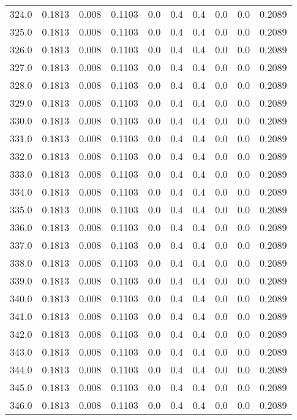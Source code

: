 \begin{longtable}{lrrrrrrrrr}
324.0 & 0.1813 & 0.008 & 0.1103 & 0.0 & 0.4 & 0.4 & 0.0 & 0.0 & 0.2089 \\
325.0 & 0.1813 & 0.008 & 0.1103 & 0.0 & 0.4 & 0.4 & 0.0 & 0.0 & 0.2089 \\
326.0 & 0.1813 & 0.008 & 0.1103 & 0.0 & 0.4 & 0.4 & 0.0 & 0.0 & 0.2089 \\
327.0 & 0.1813 & 0.008 & 0.1103 & 0.0 & 0.4 & 0.4 & 0.0 & 0.0 & 0.2089 \\
328.0 & 0.1813 & 0.008 & 0.1103 & 0.0 & 0.4 & 0.4 & 0.0 & 0.0 & 0.2089 \\
329.0 & 0.1813 & 0.008 & 0.1103 & 0.0 & 0.4 & 0.4 & 0.0 & 0.0 & 0.2089 \\
330.0 & 0.1813 & 0.008 & 0.1103 & 0.0 & 0.4 & 0.4 & 0.0 & 0.0 & 0.2089 \\
331.0 & 0.1813 & 0.008 & 0.1103 & 0.0 & 0.4 & 0.4 & 0.0 & 0.0 & 0.2089 \\
332.0 & 0.1813 & 0.008 & 0.1103 & 0.0 & 0.4 & 0.4 & 0.0 & 0.0 & 0.2089 \\
333.0 & 0.1813 & 0.008 & 0.1103 & 0.0 & 0.4 & 0.4 & 0.0 & 0.0 & 0.2089 \\
334.0 & 0.1813 & 0.008 & 0.1103 & 0.0 & 0.4 & 0.4 & 0.0 & 0.0 & 0.2089 \\
335.0 & 0.1813 & 0.008 & 0.1103 & 0.0 & 0.4 & 0.4 & 0.0 & 0.0 & 0.2089 \\
336.0 & 0.1813 & 0.008 & 0.1103 & 0.0 & 0.4 & 0.4 & 0.0 & 0.0 & 0.2089 \\
337.0 & 0.1813 & 0.008 & 0.1103 & 0.0 & 0.4 & 0.4 & 0.0 & 0.0 & 0.2089 \\
338.0 & 0.1813 & 0.008 & 0.1103 & 0.0 & 0.4 & 0.4 & 0.0 & 0.0 & 0.2089 \\
339.0 & 0.1813 & 0.008 & 0.1103 & 0.0 & 0.4 & 0.4 & 0.0 & 0.0 & 0.2089 \\
340.0 & 0.1813 & 0.008 & 0.1103 & 0.0 & 0.4 & 0.4 & 0.0 & 0.0 & 0.2089 \\
341.0 & 0.1813 & 0.008 & 0.1103 & 0.0 & 0.4 & 0.4 & 0.0 & 0.0 & 0.2089 \\
342.0 & 0.1813 & 0.008 & 0.1103 & 0.0 & 0.4 & 0.4 & 0.0 & 0.0 & 0.2089 \\
343.0 & 0.1813 & 0.008 & 0.1103 & 0.0 & 0.4 & 0.4 & 0.0 & 0.0 & 0.2089 \\
344.0 & 0.1813 & 0.008 & 0.1103 & 0.0 & 0.4 & 0.4 & 0.0 & 0.0 & 0.2089 \\
345.0 & 0.1813 & 0.008 & 0.1103 & 0.0 & 0.4 & 0.4 & 0.0 & 0.0 & 0.2089 \\
346.0 & 0.1813 & 0.008 & 0.1103 & 0.0 & 0.4 & 0.4 & 0.0 & 0.0 & 0.2089 \\

\end{longtable}
